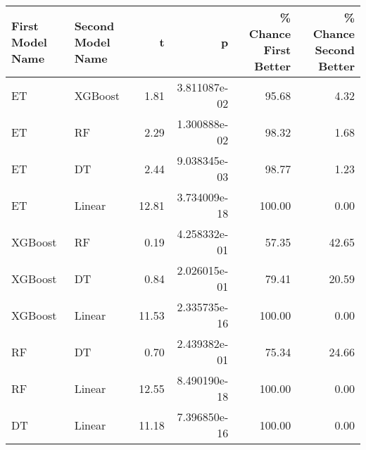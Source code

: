 \begin{tabular}{llrrrr}
\toprule
First Model Name & Second Model Name &     t &            p &  \% Chance First Better &  \% Chance Second Better \\
\midrule
              ET &           XGBoost &  1.81 & 3.811087e-02 &                  95.68 &                    4.32 \\
              ET &                RF &  2.29 & 1.300888e-02 &                  98.32 &                    1.68 \\
              ET &                DT &  2.44 & 9.038345e-03 &                  98.77 &                    1.23 \\
              ET &            Linear & 12.81 & 3.734009e-18 &                 100.00 &                    0.00 \\
         XGBoost &                RF &  0.19 & 4.258332e-01 &                  57.35 &                   42.65 \\
         XGBoost &                DT &  0.84 & 2.026015e-01 &                  79.41 &                   20.59 \\
         XGBoost &            Linear & 11.53 & 2.335735e-16 &                 100.00 &                    0.00 \\
              RF &                DT &  0.70 & 2.439382e-01 &                  75.34 &                   24.66 \\
              RF &            Linear & 12.55 & 8.490190e-18 &                 100.00 &                    0.00 \\
              DT &            Linear & 11.18 & 7.396850e-16 &                 100.00 &                    0.00 \\
\bottomrule
\end{tabular}
